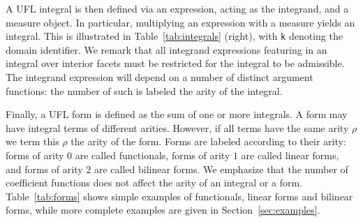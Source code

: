 \documentclass[prodmode,acmtoms]{acmsmall}
\newcommand{\uflc}[1]{\texttt{#1}}
\begin{document}
A UFL integral is then defined via an expression, acting as the
integrand, and a measure object. In particular, multiplying an
expression with a measure yields an integral. This is illustrated in
Table~\ref{tab:integrals} (right), with \uflc{k} denoting the domain
identifier. We remark that all integrand expressions featuring in an
integral over interior facets must be restricted for the integral to
be admissible. The integrand expression will depend on a number of
distinct argument functions: the number of such is labeled the arity
of the integral.

Finally, a UFL form is defined as the sum of one or more integrals. A
form may have integral terms of different arities. However, if all
terms have the same arity $\rho$ we term this $\rho$ the arity of the
form.  Forms are labeled according to their arity: forms of arity $0$
are called functionals, forms of arity $1$ are called linear forms, and
forms of arity $2$ are called bilinear forms. We emphasize that the
number of coefficient functions does not affect the arity of an
integral or a form. Table~\ref{tab:forms} shows simple examples of
functionals, linear forms and bilinear forms, while more complete
examples are given in Section~\ref{sec:examples}.
\end{document}
